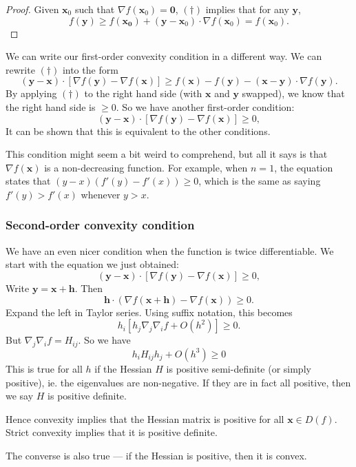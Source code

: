 \documentclass[a4paper]{article}
\begin{document}
\begin{proof}
  Given $\mathbf{x}_0$ such that $\nabla f(\mathbf{x}_0) = \mathbf{0}$, $(\dagger)$ implies that for any $\mathbf{y}$,
  \[
    f(\mathbf{y}) \geq f(\mathbf{x_0}) + (\mathbf{y} - \mathbf{x}_0)\cdot \nabla f(\mathbf{x}_0) = f(\mathbf{x}_0).
  \]
\end{proof}
We can write our first-order convexity condition in a different way. We can rewrite $(\dagger)$ into the form
\[
  (\mathbf{y} - \mathbf{x}) \cdot [\nabla f(\mathbf{y}) - \nabla f(\mathbf{x})] \geq f(\mathbf{x}) - f(\mathbf{y}) - (\mathbf{x} - \mathbf{y}) \cdot \nabla f(\mathbf{y}).
\]
By applying $(\dagger)$ to the right hand side (with $\mathbf{x}$ and $\mathbf{y}$ swapped), we know that the right hand side is $\geq 0$. So we have another first-order condition:
\[
  (\mathbf{y} - \mathbf{x})\cdot [\nabla f(\mathbf{y}) - \nabla f(\mathbf{x})] \geq 0,
\]
It can be shown that this is equivalent to the other conditions.

This condition might seem a bit weird to comprehend, but all it says is that $\nabla f(\mathbf{x})$ is a non-decreasing function. For example, when $n = 1$, the equation states that $(y - x)(f'(y) - f'(x)) \geq 0$, which is the same as saying $f'(y) > f'(x)$ whenever $y > x$.

\subsubsection{Second-order convexity condition}
We have an even nicer condition when the function is twice differentiable. We start with the equation we just obtained:
\[
  (\mathbf{y} - \mathbf{x})\cdot [\nabla f(\mathbf{y}) - \nabla f(\mathbf{x})] \geq 0,
\]
Write $\mathbf{y} = \mathbf{x} + \mathbf{h}$. Then
\[
  \mathbf{h} \cdot (\nabla f(\mathbf{x} + \mathbf{h}) - \nabla f(\mathbf{x})) \geq 0.
\]
Expand the left in Taylor series. Using suffix notation, this becomes
\[
  h_i [h_j \nabla_j \nabla_i f + O(h^2)] \geq 0.
\]
But $\nabla_j \nabla_i f = H_{ij}$. So we have
\[
  h_i H_{ij}h_j + O(h^3) \geq 0
\]
This is true for all $h$ if the Hessian $H$ is positive semi-definite (or simply positive), ie. the eigenvalues are non-negative. If they are in fact all positive, then we say $H$ is positive definite.

Hence convexity implies that the Hessian matrix is positive for all $\mathbf{x}\in D(f)$. Strict convexity implies that it is positive definite.

The converse is also true --- if the Hessian is positive, then it is convex.
\end{document}
